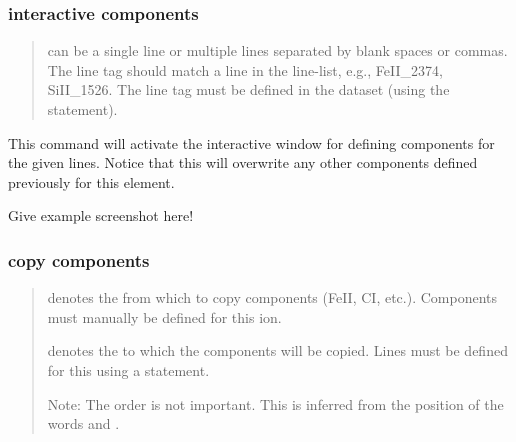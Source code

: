\documentclass[letterpaper,10pt,english]{sphinxmanual}
\begin{document}
\subsubsection{interactive components}
\label{\detokenize{documentation:interactive-components}}
\begin{quote}

 can be a single line or multiple lines separated by blank spaces or commas.
The line tag should match a line in the line-list, e.g., FeII\_2374, SiII\_1526.
The line tag must be defined in the dataset (using the  statement).
\end{quote}

This command will activate the interactive window for defining components for the given lines.
Notice that this will overwrite any other components defined previously for this element.

\begin{sphinxShadowBox}

Give example screenshot here!
\end{sphinxShadowBox}


\subsubsection{copy components}
\label{\detokenize{documentation:copy-components}}
\begin{quote}

 denotes the  from which to copy components (FeII, CI, etc.).
Components must manually be defined for this ion.

 denotes the  to which the components will be copied.
Lines must be defined for this  using a  statement.

Note: The order is not important. This is inferred from the position of the words  and .
\end{quote}
\end{document}
